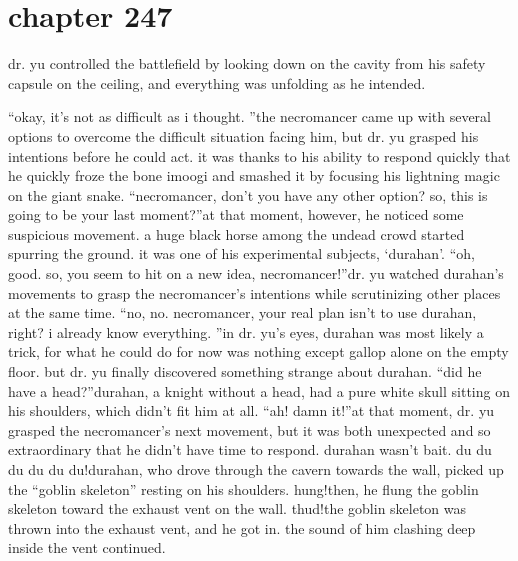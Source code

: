 \section{chapter 247}

                            dr.
 yu controlled the battlefield by looking down on the cavity from his safety capsule on the ceiling, and everything was unfolding as he intended.





“okay, it’s not as difficult as i thought.
”the necromancer came up with several options to overcome the difficult situation facing him, but dr.
 yu grasped his intentions before he could act.
it was thanks to his ability to respond quickly that he quickly froze the bone imoogi and smashed it by focusing his lightning magic on the giant snake.
“necromancer, don’t you have any other option? so, this is going to be your last moment?”at that moment, however, he noticed some suspicious movement.
 a huge black horse among the undead crowd started spurring the ground.
 it was one of his experimental subjects, ‘durahan’.
“oh, good.
 so, you seem to hit on a new idea, necromancer!”dr.
 yu watched durahan’s movements to grasp the necromancer’s intentions while scrutinizing other places at the same time.
“no, no.
 necromancer, your real plan isn’t to use durahan, right? i already know everything.
”in dr.
 yu’s eyes, durahan was most likely a trick, for what he could do for now was nothing except gallop alone on the empty floor.
but dr.
 yu finally discovered something strange about durahan.
“did he have a head?”durahan, a knight without a head, had a pure white skull sitting on his shoulders, which didn’t fit him at all.
“ah! damn it!”at that moment, dr.
 yu grasped the necromancer’s next movement, but it was both unexpected and so extraordinary that he didn’t have time to respond.
durahan wasn’t bait.
du du du du du du!durahan, who drove through the cavern towards the wall, picked up the “goblin skeleton” resting on his shoulders.
hung!then, he flung the goblin skeleton toward the exhaust vent on the wall.
thud!the goblin skeleton was thrown into the exhaust vent, and he got in.
the sound of him clashing deep inside the vent continued.

